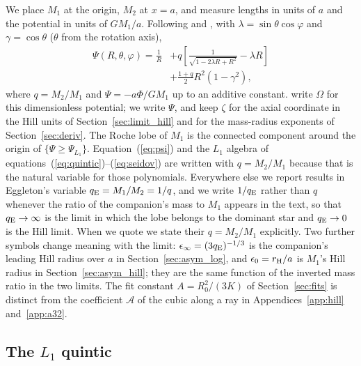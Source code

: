 \documentclass[twocolumn]{aastex702}
\newcommand{\qE}{q_{\rm E}}
\begin{document}
We place $M_1$ at the origin, $M_2$ at $x=a$, and measure lengths in units of $a$ and the potential in units of $GM_1/a$. Following \citet{Kopal1959} and \citet{Qi2026}, with $\lambda=\sin\theta\cos\varphi$ and $\gamma=\cos\theta$ ($\theta$ from the rotation axis),
\begin{equation}
\begin{split}
\Psi(R,\theta,\varphi)=\frac1R&+q\left[\frac{1}{\sqrt{1-2\lambda R+R^2}}-\lambda R\right]\\
&+\frac{1+q}{2}R^2(1-\gamma^2),
\end{split}
\label{eq:psi}
\end{equation}
where $q=M_2/M_1$ and $\Psi=-a\Phi/GM_1$ up to an additive constant. \citet{Qi2026} write $\Omega$ for this dimensionless potential; we write $\Psi$, and keep $\zeta$ for the axial coordinate in the Hill units of Section~\ref{sec:limit_hill} and for the mass-radius exponents of Section~\ref{sec:deriv}. The Roche lobe of $M_1$ is the connected component around the origin of $\{\Psi\ge\Psi_{L_1}\}$. Equation~(\ref{eq:psi}) and the $L_1$ algebra of equations~(\ref{eq:quintic})--(\ref{eq:seidov}) are written with $q=M_2/M_1$ because that is the natural variable for those polynomials. Everywhere else we report results in Eggleton's variable $\qE=M_1/M_2=1/q$, and we write $1/\qE$ rather than $q$ whenever the ratio of the companion's mass to $M_1$ appears in the text, so that $\qE\to\infty$ is the limit in which the lobe belongs to the dominant star and $\qE\to0$ is the Hill limit. When we quote \citet{LeahyLeahy2015} we state their $q=M_2/M_1$ explicitly. Two further symbols change meaning with the limit: $\epsilon_\infty=(3\qE)^{-1/3}$ is the companion's leading Hill radius over $a$ in Section~\ref{sec:asym_log}, and $\epsilon_0=r_{\rm H}/a$ is $M_1$'s Hill radius in Section~\ref{sec:asym_hill}; they are the same function of the inverted mass ratio in the two limits. The fit constant $A=R_0^2/(3K)$ of Section~\ref{sec:fits} is distinct from the coefficient $\mathcal A$ of the cubic along a ray in Appendices~\ref{app:hill} and~\ref{app:a32}.

\subsection{The $L_1$ quintic}
\end{document}
